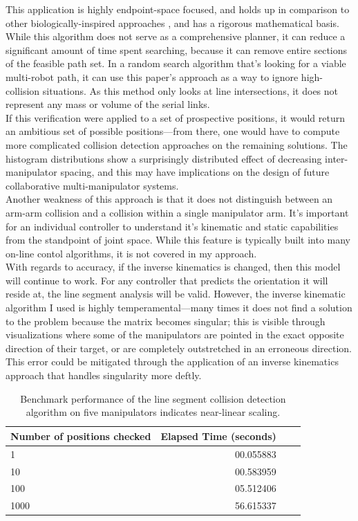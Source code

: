 \documentclass[9pt,twocolumn,twoside]{pnas-new}
\begin{document}
This application is highly endpoint-space focused, and holds up in comparison to other biologically-inspired approaches \cite{teja2016learning}, and has a rigorous mathematical basis. While this algorithm does not serve as a comprehensive planner, it can reduce a significant amount of time spent searching, because it can remove entire sections of the feasible path set. In a random search algorithm that's looking for a viable multi-robot path, it can use this paper's approach as a way to ignore high-collision situations. As this method only looks at line intersections, it does not represent any mass or volume of the serial links. \\If this verification were applied to a set of prospective positions, it would return an ambitious set of possible positions---from there, one would have to compute more complicated collision detection approaches on the remaining solutions. The histogram distributions show a surprisingly distributed effect of decreasing inter-manipulator spacing, and this may have implications on the design of future collaborative multi-manipulator systems.
\\
Another weakness of this approach is that it does not distinguish between an arm-arm collision and a collision within a single manipulator arm. It's important for an individual controller to understand it's kinematic and static capabilities from the standpoint of joint space. While this feature is typically built into many on-line contol algorithms, it is not covered in my approach.
\\
With regards to accuracy, if the inverse kinematics is changed, then this model will continue to work. For any controller that predicts the orientation it will reside at, the line segment analysis will be valid. However, the inverse kinematic algorithm I used is highly temperamental---many times it does not find a solution to the problem because the matrix becomes singular; this is visible through visualizations where some of the manipulators are pointed in the exact opposite direction of their target, or are completely outstretched in an erroneous direction. This error could be mitigated through the application of an inverse kinematics approach that handles singularity more deftly.

\begin{table}%

\caption{Benchmark performance of the line segment collision detection algorithm on five manipulators indicates near-linear scaling.} \label{tab:a}
\begin{tabular}{lrrr}
\centering
Number of positions checked & Elapsed Time (seconds) \\
\midrule
1 & 00.055883 \\
10 & 00.583959 \\
100 & 05.512406 \\
1000 & 56.615337 \\
\bottomrule
\end{tabular}
\end{table}
\end{document}
